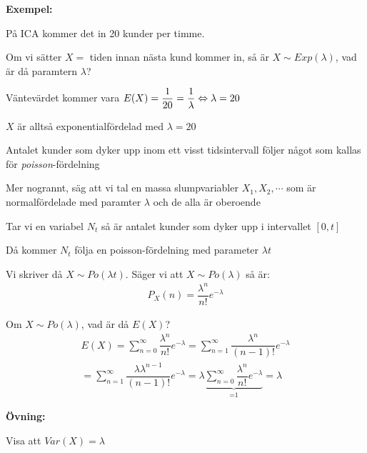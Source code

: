 \newpage
\noindent\textbf{Exempel:}\par
\noindent På ICA kommer det in 20 kunder per timme.\par
\noindent Om vi sätter $X = $ tiden innan nästa kund kommer in, så är $X\sim Exp(\lambda)$, vad är då paramtern $\lambda$?
\par\bigskip
\noindent Väntevärdet kommer vara $E(X) = \dfrac{1}{20} = \dfrac{1}{\lambda}\Leftrightarrow \lambda = 20$\par
\noindent $X$ är alltså exponentialfördelad med $\lambda = 20$
\par\bigskip
\noindent Antalet kunder som dyker upp inom ett visst tidsintervall följer något som kallas för \textit{poisson}-fördelning
\par\bigskip
\noindent Mer nogrannt, säg att vi tal en massa slumpvariabler $X_1,X_2,\cdots$ som är normalfördelade med paramter $\lambda$ och de alla är oberoende\par
\noindent Tar vi en variabel $N_t$ så är antalet kunder som dyker upp i intervallet $[0,t]$\par
\noindent Då kommer $N_t$ följa en poisson-fördelning med parameter $\lambda t$
\par\bigskip
\noindent Vi skriver då $X\sim Po(\lambda t)$. Säger vi att $X\sim Po(\lambda)$ så är:
\begin{equation*}
  \begin{gathered}
    P_X(n) = \dfrac{\lambda^n}{n!}e^{-\lambda}
  \end{gathered}
\end{equation*}
\par\bigskip
\noindent Om $X\sim Po(\lambda)$, vad är då $E(X)$?
\begin{equation*}
  \begin{gathered}
    E(X) = \sum_{n=0}^{\infty}\dfrac{\lambda^n}{n!}e^{-\lambda} = \sum_{n=1}^{\infty}\dfrac{\lambda^n}{(n-1)!}e^{-\lambda}\\
    = \sum_{n=1}^{\infty}\dfrac{\lambda \lambda^{n-1}}{(n-1)!}e^{-\lambda} = \lambda\underbrace{\sum_{n=0}^{\infty}\dfrac{\lambda^n}{n!}e^{-\lambda}}_{\text{=1}} = \lambda
  \end{gathered}
\end{equation*}
\par\bigskip
\noindent\textbf{Övning:}\par
\noindent Visa att $Var(X) = \lambda$
\par\bigskip
